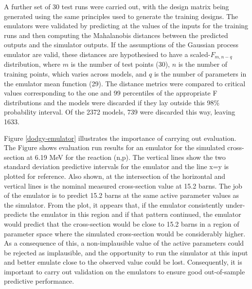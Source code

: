 \documentclass[
  12pt,
  a4paper,
  twoside]{book}
\begin{document}
A further set of 30 test runs were carried out, with the design matrix being generated using the same principles used to generate the training designs. The emulators were validated by predicting at the values of the inputs for the training runs and then computing the Mahalanobis distances between the predicted outputs and the simulator outputs. If the assumptions of the Gaussian process emulator are valid, these distances are hypothesised to have a scaled-\(F_{m,n-q}\) distribution, where \(m\) is the number of test points (30), \(n\) is the number of training points, which varies across models, and \(q\) is the number of parameters in the emulator mean function (29). The distance metrics were compared to critical values corresponding to the one and 99 percentiles of the appropriate F distributions and the models were discarded if they lay outside this 98\% probability interval. Of the 2372 models, 739 were discarded this way, leaving 1633.

Figure \ref{dodgy-emulator} illustrates the importance of carrying out evaluation. The Figure shows evaluation run results for an emulator for the simulated cross-section at 6.19 MeV for the reaction (n,p). The vertical lines show the two standard deviation predictive intervals for the emulator and the line x=y is plotted for reference. Also shown, at the intersection of the horizontal and vertical lines is the nominal measured cross-section value at 15.2 barns. The job of the emulator is to predict 15.2 barns at the same active parameter values as the simulator. From the plot, it appears that, if the emulator consistently under-predicts the emulator in this region and if that pattern continued, the emulator would predict that the cross-section would be close to 15.2 barns in a region of parameter space where the simulated cross-section would be considerably higher. As a consequence of this, a non-implausible value of the active parameters could be rejected as implausible, and the opportunity to run the simulator at this input and better emulate close to the observed value could be lost. Consequently, it is important to carry out validation on the emulators to ensure good out-of-sample predictive performance.
\end{document}
